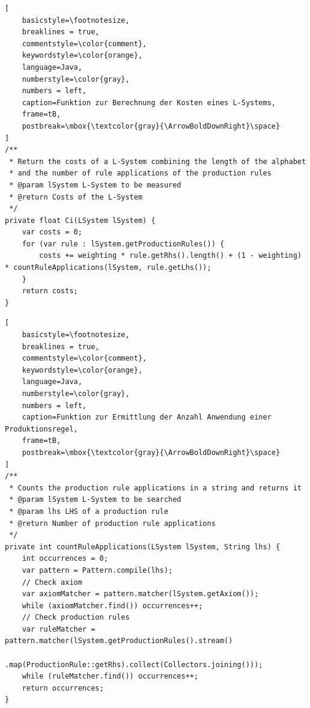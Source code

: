 \newpage

\begin{lstlisting}[
    basicstyle=\footnotesize,
    breaklines = true,
    commentstyle=\color{comment},
    keywordstyle=\color{orange},
    language=Java,
    numberstyle=\color{gray},
    numbers = left,
    caption=Funktion zur Berechnung der Kosten eines L-Systems,
    frame=tB,
    postbreak=\mbox{\textcolor{gray}{\ArrowBoldDownRight}\space}
]
/**
 * Return the costs of a L-System combining the length of the alphabet
 * and the number of rule applications of the production rules
 * @param lSystem L-System to be measured
 * @return Costs of the L-System
 */
private float Ci(LSystem lSystem) {
    var costs = 0;
    for (var rule : lSystem.getProductionRules()) {
        costs += weighting * rule.getRhs().length() + (1 - weighting) * countRuleApplications(lSystem, rule.getLhs());
    }
    return costs;
}
\end{lstlisting}
\begin{lstlisting}[
    basicstyle=\footnotesize,
    breaklines = true,
    commentstyle=\color{comment},
    keywordstyle=\color{orange},
    language=Java,
    numberstyle=\color{gray},
    numbers = left,
    caption=Funktion zur Ermittlung der Anzahl Anwendung einer Produktionsregel,
    frame=tB,
    postbreak=\mbox{\textcolor{gray}{\ArrowBoldDownRight}\space}
]
/**
 * Counts the production rule applications in a string and returns it
 * @param lSystem L-System to be searched
 * @param lhs LHS of a production rule
 * @return Number of production rule applications
 */
private int countRuleApplications(LSystem lSystem, String lhs) {
    int occurrences = 0;
    var pattern = Pattern.compile(lhs);
    // Check axiom
    var axiomMatcher = pattern.matcher(lSystem.getAxiom());
    while (axiomMatcher.find()) occurrences++;
    // Check production rules
    var ruleMatcher = pattern.matcher(lSystem.getProductionRules().stream()
            .map(ProductionRule::getRhs).collect(Collectors.joining()));
    while (ruleMatcher.find()) occurrences++;
    return occurrences;
}
\end{lstlisting}

\newpage

